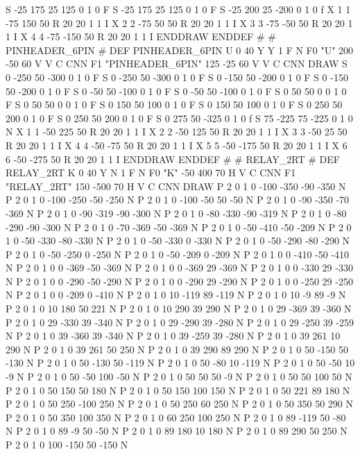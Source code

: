 S -25 175 25 125 0 1 0 F
S -25 175 25 125 0 1 0 F
S -25 200 25 -200 0 1 0 f
X 1 1 -75 150 50 R 20 20 1 1 I
X 2 2 -75 50 50 R 20 20 1 1 I
X 3 3 -75 -50 50 R 20 20 1 1 I
X 4 4 -75 -150 50 R 20 20 1 1 I
ENDDRAW
ENDDEF
#
# PINHEADER_6PIN
#
DEF PINHEADER_6PIN U 0 40 Y Y 1 F N
F0 "U" 200 -50 60 V V C CNN
F1 "PINHEADER_6PIN" 125 -25 60 V V C CNN
DRAW
S 0 -250 50 -300 0 1 0 F
S 0 -250 50 -300 0 1 0 F
S 0 -150 50 -200 0 1 0 F
S 0 -150 50 -200 0 1 0 F
S 0 -50 50 -100 0 1 0 F
S 0 -50 50 -100 0 1 0 F
S 0 50 50 0 0 1 0 F
S 0 50 50 0 0 1 0 F
S 0 150 50 100 0 1 0 F
S 0 150 50 100 0 1 0 F
S 0 250 50 200 0 1 0 F
S 0 250 50 200 0 1 0 F
S 0 275 50 -325 0 1 0 f
S 75 -225 75 -225 0 1 0 N
X 1 1 -50 225 50 R 20 20 1 1 I
X 2 2 -50 125 50 R 20 20 1 1 I
X 3 3 -50 25 50 R 20 20 1 1 I
X 4 4 -50 -75 50 R 20 20 1 1 I
X 5 5 -50 -175 50 R 20 20 1 1 I
X 6 6 -50 -275 50 R 20 20 1 1 I
ENDDRAW
ENDDEF
#
# RELAY_2RT
#
DEF RELAY_2RT K 0 40 Y N 1 F N
F0 "K" -50 400 70 H V C CNN
F1 "RELAY_2RT" 150 -500 70 H V C CNN
DRAW
P 2 0 1 0  -100 -350  -90 -350 N
P 2 0 1 0  -100 -250  -50 -250 N
P 2 0 1 0  -100 -50  50 -50 N
P 2 0 1 0  -90 -350  -70 -369 N
P 2 0 1 0  -90 -319  -90 -300 N
P 2 0 1 0  -80 -330  -90 -319 N
P 2 0 1 0  -80 -290  -90 -300 N
P 2 0 1 0  -70 -369  -50 -369 N
P 2 0 1 0  -50 -410  -50 -209 N
P 2 0 1 0  -50 -330  -80 -330 N
P 2 0 1 0  -50 -330  0 -330 N
P 2 0 1 0  -50 -290  -80 -290 N
P 2 0 1 0  -50 -250  0 -250 N
P 2 0 1 0  -50 -209  0 -209 N
P 2 0 1 0  0 -410  -50 -410 N
P 2 0 1 0  0 -369  -50 -369 N
P 2 0 1 0  0 -369  29 -369 N
P 2 0 1 0  0 -330  29 -330 N
P 2 0 1 0  0 -290  -50 -290 N
P 2 0 1 0  0 -290  29 -290 N
P 2 0 1 0  0 -250  29 -250 N
P 2 0 1 0  0 -209  0 -410 N
P 2 0 1 0  10 -119  89 -119 N
P 2 0 1 0  10 -9  89 -9 N
P 2 0 1 0  10 180  50 221 N
P 2 0 1 0  10 290  39 290 N
P 2 0 1 0  29 -369  39 -360 N
P 2 0 1 0  29 -330  39 -340 N
P 2 0 1 0  29 -290  39 -280 N
P 2 0 1 0  29 -250  39 -259 N
P 2 0 1 0  39 -360  39 -340 N
P 2 0 1 0  39 -259  39 -280 N
P 2 0 1 0  39 261  10 290 N
P 2 0 1 0  39 261  50 250 N
P 2 0 1 0  39 290  89 290 N
P 2 0 1 0  50 -150  50 -130 N
P 2 0 1 0  50 -130  50 -119 N
P 2 0 1 0  50 -80  10 -119 N
P 2 0 1 0  50 -50  10 -9 N
P 2 0 1 0  50 -50  100 -50 N
P 2 0 1 0  50 50  50 -9 N
P 2 0 1 0  50 50  100 50 N
P 2 0 1 0  50 150  50 180 N
P 2 0 1 0  50 150  100 150 N
P 2 0 1 0  50 221  89 180 N
P 2 0 1 0  50 250  -100 250 N
P 2 0 1 0  50 250  60 250 N
P 2 0 1 0  50 350  50 290 N
P 2 0 1 0  50 350  100 350 N
P 2 0 1 0  60 250  100 250 N
P 2 0 1 0  89 -119  50 -80 N
P 2 0 1 0  89 -9  50 -50 N
P 2 0 1 0  89 180  10 180 N
P 2 0 1 0  89 290  50 250 N
P 2 0 1 0  100 -150  50 -150 N
